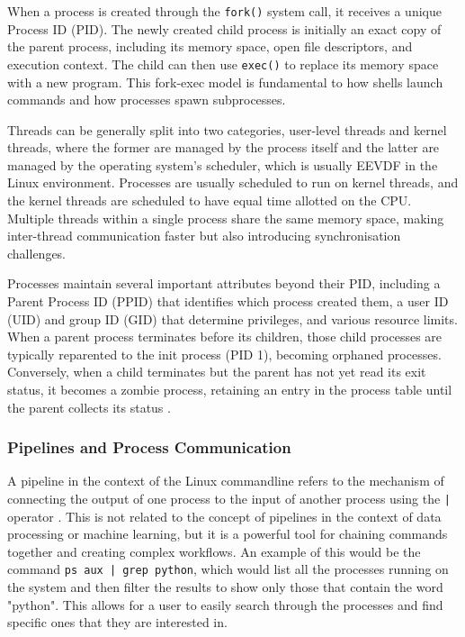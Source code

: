 When a process is created through the \texttt{fork()} system call, it receives a unique Process ID (PID). The newly created child process is initially an exact copy of the parent process, including its memory space, open file descriptors, and execution context. The child can then use \texttt{exec()} to replace its memory space with a new program. This fork-exec model is fundamental to how shells launch commands and how processes spawn subprocesses.

Threads can be generally split into two categories, user-level threads and kernel threads, where the former are managed by the process itself and the latter are managed by the operating system's scheduler, which is usually EEVDF \parencite[EEVDF Scheduler]{KernelSchedManual} in the Linux environment. Processes are usually scheduled to run on kernel threads, and the kernel threads are scheduled to have equal time allotted on the CPU. Multiple threads within a single process share the same memory space, making inter-thread communication faster but also introducing synchronisation challenges.

Processes maintain several important attributes beyond their PID, including a Parent Process ID (PPID) that identifies which process created them, a user ID (UID) and group ID (GID) that determine privileges, and various resource limits. When a parent process terminates before its children, those child processes are typically reparented to the init process (PID 1), becoming orphaned processes. Conversely, when a child terminates but the parent has not yet read its exit status, it becomes a zombie process, retaining an entry in the process table until the parent collects its status \parencite{GnuBashManual}.

\subsubsection{Pipelines and Process Communication}
\label{PipelinesAndProcessComm}

A pipeline in the context of the Linux commandline refers to the mechanism of connecting the output of one process to the input of another process using the \texttt{|} operator \parencite{GFGPiping}. This is not related to the concept of pipelines in the context of data processing or machine learning, but it is a powerful tool for chaining commands together and creating complex workflows. An example of this would be the command \texttt{ps aux | grep python}, which would list all the processes running on the system and then filter the results to show only those that contain the word "python". This allows for a user to easily search through the processes and find specific ones that they are interested in.

